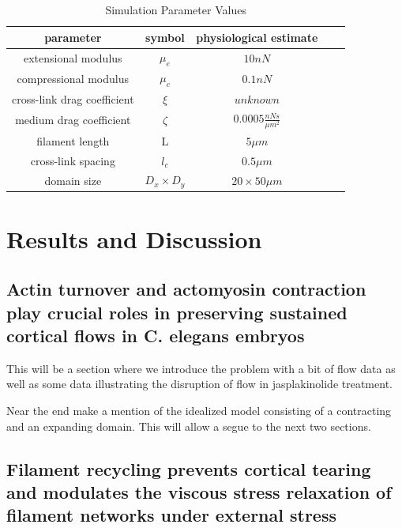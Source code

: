 \documentclass[10pt,letterpaper]{article}
\begin{document}
\begin{table}[h]
\centering
\caption{Simulation Parameter Values}
\label{table:para}
\begin{tabular}{|c|c|c|c|c|}
\hline
{\bf parameter}             & {\bf symbol} & {\bf physiological estimate}          \\ \hline
extensional modulus         & $\mu_e$        & $10 nN $                                               \\
compressional modulus             & $\mu_c$     & $ 0.1 nN $                           \\
cross-link drag coefficient & $\xi$      & $unknown $              \\
medium drag coefficient     & $\zeta$        & $0.0005 \frac{nN s}{\mu m^2} $      \\
filament length             & L            & $5 \mu m$                                          \\
cross-link spacing          & $l_c$        & $0.5 \mu m$                                         \\
domain size                 & $D_x\times D_y$            & $20\times 50 \mu m$                                 \\ \hline
\end{tabular}
\end{table}



\section*{Results and Discussion}

\subsection*{Actin turnover and actomyosin contraction play crucial roles in preserving sustained cortical flows in C. elegans embryos}

This will be a section where we introduce the problem with a bit of flow data as well as some data illustrating the disruption of flow in jasplakinolide treatment.

Near the end make a mention of the idealized model consisting of a contracting and an expanding domain.  This will allow a segue to the next two sections.

\subsection*{Filament recycling prevents cortical tearing and modulates the viscous stress relaxation of filament networks under external stress}
\end{document}
